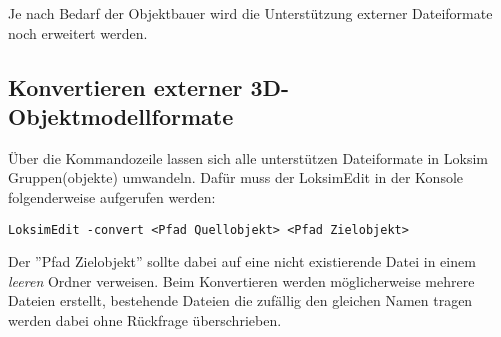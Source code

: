Je nach Bedarf der Objektbauer wird die Unterstützung externer Dateiformate noch erweitert werden.

\subsection{Konvertieren externer 3D-Objektmodellformate}
\label{sec:editor-obj-externe-konvertieren}
Über die Kommandozeile lassen sich alle unterstützen Dateiformate in Loksim Gruppen(objekte) umwandeln. Dafür muss der LoksimEdit in der Konsole folgenderweise aufgerufen werden:
\begin{verbatim}
LoksimEdit -convert <Pfad Quellobjekt> <Pfad Zielobjekt>
\end{verbatim}
Der ''Pfad Zielobjekt'' sollte dabei auf eine nicht existierende Datei in einem \emph{leeren} Ordner verweisen. Beim Konvertieren werden möglicherweise mehrere Dateien erstellt, bestehende Dateien die zufällig den gleichen Namen tragen werden dabei ohne Rückfrage überschrieben.
